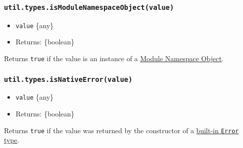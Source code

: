 \subsubsection{\texorpdfstring{\texttt{util.types.isModuleNamespaceObject(value)}}{util.types.isModuleNamespaceObject(value)}}\label{util.types.ismodulenamespaceobjectvalue}

\begin{itemize}
\tightlist
\item
  \texttt{value} \{any\}
\item
  Returns: \{boolean\}
\end{itemize}

Returns \texttt{true} if the value is an instance of a
\href{https://tc39.github.io/ecma262/\#sec-module-namespace-exotic-objects}{Module
Namespace Object}.

\begin{Shaded}
\begin{Highlighting}[]
 \OperatorTok{*}  \OperatorTok{;}

\OperatorTok{;}  
\end{Highlighting}
\end{Shaded}

\subsubsection{\texorpdfstring{\texttt{util.types.isNativeError(value)}}{util.types.isNativeError(value)}}\label{util.types.isnativeerrorvalue}

\begin{itemize}
\tightlist
\item
  \texttt{value} \{any\}
\item
  Returns: \{boolean\}
\end{itemize}

Returns \texttt{true} if the value was returned by the constructor of a
\href{https://tc39.es/ecma262/\#sec-error-objects}{built-in
\texttt{Error} type}.

\begin{Shaded}
\begin{Highlighting}[]
\NormalTok{(} \NormalTok{()))}\OperatorTok{;}  
\NormalTok{(} \NormalTok{()))}\OperatorTok{;}  
\NormalTok{(} \NormalTok{()))}\OperatorTok{;}  
\end{Highlighting}
\end{Shaded}

